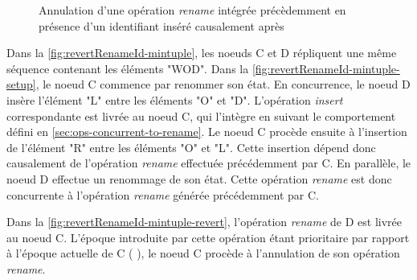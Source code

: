 \begin{figure}[!ht]
{\begin{minipage}{\linewidth}
{
        }
        \label{fig:revertRenameId-mintuple-revert}
    \end{minipage}}
  \caption{Annulation d'une opération \emph{rename} intégrée précèdemment en présence d'un identifiant inséré causalement après}
  \label{fig:revertRenameId-mintuple}
\end{figure}

Dans la \autoref{fig:revertRenameId-mintuple}, les noeuds C et D répliquent une même séquence contenant les éléments "WOD".
Dans la \autoref{fig:revertRenameId-mintuple-setup}, le noeud C commence par renommer son état.
En concurrence, le noeud D insère l'élément "L" entre les éléments "O" et "D".
L'opération \emph{insert} correspondante est livrée au noeud C, qui l'intègre en suivant le comportement défini en \autoref{sec:ops-concurrent-to-rename}.
Le noeud C procède ensuite à l'insertion de l'élément "R" entre les éléments "O" et "L".
Cette insertion dépend donc causalement de l'opération \emph{rename} effectuée précédemment par C.
En parallèle, le noeud D effectue un renommage de son état.
Cette opération \emph{rename} est donc concurrente à l'opération \emph{rename} générée précédemment par C.

Dans la \autoref{fig:revertRenameId-mintuple-revert}, l'opération \emph{rename} de D est livrée au noeud C.
L'époque introduite par cette opération étant prioritaire par rapport à l'époque actuelle de C ( \lepoch {}), le noeud C procède à l'annulation de son opération \emph{rename}.

